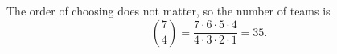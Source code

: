 The order of choosing does not matter, so the number of teams is
\[
\binom74=\dfrac{7\cdot6\cdot5\cdot4}{4\cdot3\cdot2\cdot1}=\boxed{35}.
\]
